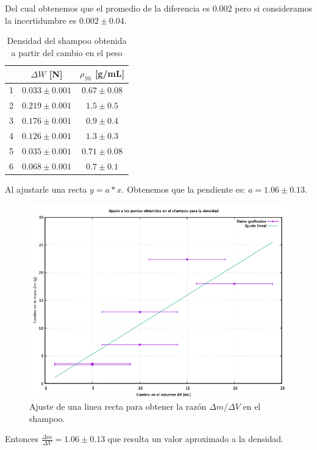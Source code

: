 \documentclass[a4paper]{article}
\begin{document}
Del cual obtenemos que el promedio de la diferencia es 0.002 pero si consideramos la incertidumbre es $0.002\pm0.04$.

\begin{table}[H]
  \centering
    \begin{tabular}{|c|c|c|} \hline
          & $\Delta W$ [N] & $\rho_{Sh}$ [g/mL]  \\ \hline
    1     & $0.033\pm0.001$ & $0.67\pm0.08$   \\ \hline
    2     & $0.219\pm0.001$ & $1.5\pm0.5$   \\ \hline
    3     & $0.176\pm0.001$ & $0.9\pm0.4$  \\ \hline
    4     & $0.126\pm0.001$ & $1.3\pm0.3$   \\ \hline
    5     & $0.035\pm0.001$ & $0.71\pm0.08$   \\ \hline
    6     & $0.068\pm0.001$ & $0.7\pm0.1$   \\ \hline
    \end{tabular}%
  \caption{Densidad del shampoo obtenida a partir del cambio en el peso }
\end{table}%

Al ajustarle una recta $y = a*x$. Obtenemos que la pendiente es: $a = 1.06 \pm 0.13$.
\begin{figure}[H]
    \centering
    \includegraphics[width=12cm]{Shampooden.png}
    \caption{Ajuste de una linea recta para obtener la razón $\Delta m / \Delta V$ en el shampoo.}
\end{figure}

Entonces $\frac{\Delta m}{\Delta V} = 1.06 \pm 0.13$ que resulta un valor aproximado a la densidad.
\end{document}
